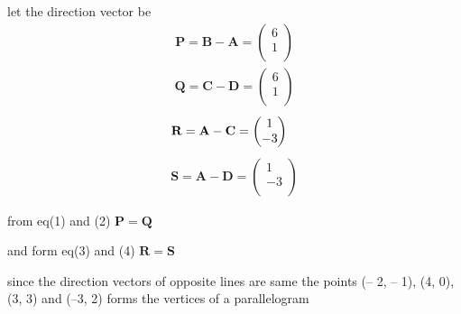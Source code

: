 \documentclass[journal,12pt,twocolumn]{IEEEtran}
\let\vec\mathbf
\begin{document}
let the direction vector be
\begin{align}
 \vec{P} =\vec{B}-\vec{A}=\begin{pmatrix}6 \\ 1 \\ \end{pmatrix}
\end{align}
  \hspace{0.3cm}
\begin{align}  
   \vec{Q}=\vec{C}-\vec{D}=\begin{pmatrix}6 \\ 1 \\ \end{pmatrix}
\end{align}
\begin{align}
\vec{R}=\vec{A}-\vec{C}=\begin{pmatrix}1 \\ -3 \\ \end{pmatrix}
 \hspace{0.3cm}
\end{align} 
\begin{align}
 \vec{S}=\vec{A}-\vec{D}=\begin{pmatrix}1 \\ -3 \\ \end{pmatrix}
\end{align}
\unboldmath

from eq(1) and (2) $\vec{P}=\vec{Q}$

and form eq(3) and (4) $\vec{R}=\vec{S}$


since the direction vectors of opposite lines are same the points (– 2, – 1), (4, 0), (3, 3) and (–3, 2) forms the vertices of a parallelogram
\end{document}
